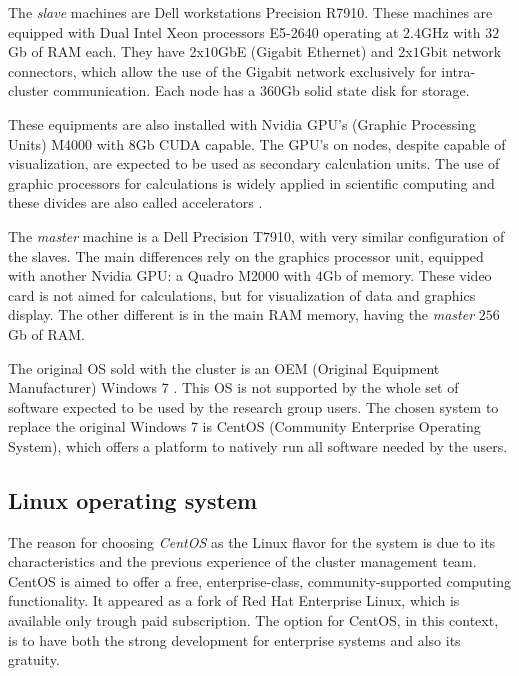 \documentclass[twoside,a4paper,12pt,english]{inac17}
\begin{document}
The \textit{slave} machines are Dell workstations Precision R7910. These machines are equipped
with Dual Intel{\textregistered} Xeon{\textregistered} processors E5-2640 operating at $2.4$GHz with
$32$Gb of RAM each. They have 2x$10$GbE (Gigabit Ethernet) and 2x$1$Gbit network connectors, which
allow the use of the Gigabit network exclusively for intra-cluster communication. Each node
has a $360$Gb solid state disk for storage.

These equipments are also installed with Nvidia{\textregistered} GPU's (Graphic Processing Units) M4000{\textregistered} with $8$Gb CUDA\cite{CUDA} capable.
The GPU's on nodes, despite capable of visualization, are expected to be used as secondary calculation units.
The use of graphic processors for calculations is widely applied in scientific computing and these divides
are also called accelerators \cite{Accelerators}.

The \textit{master} machine is a Dell Precision T7910, with very similar configuration of the slaves. The main
differences rely on the graphics processor unit, equipped with another Nvidia{\textregistered} GPU: a
Quadro{\textregistered} M2000 with $4$Gb of memory. These video card is not aimed for calculations, but for
visualization of data and graphics display. The other different is in the main RAM memory, having the \textit{master}
$256$Gb of RAM. 

The original OS sold with the cluster is an OEM (Original Equipment Manufacturer) Windows 7{\textregistered} \cite{windows7}. This
OS is not supported by the whole set of software expected to be used by the research group users. The chosen
system to replace the original Windows 7 is CentOS (Community Enterprise Operating System)\cite{centos}, which offers a platform to natively run all
software needed by the users.

\subsection{Linux operating system}

The reason for choosing \textit{CentOS} as the Linux flavor for the system is due to its characteristics and the previous
experience of the cluster management team. CentOS is aimed to offer a free, enterprise-class, community-supported computing
functionality. It appeared as a fork of Red Hat Enterprise Linux, which is available only trough paid subscription. The option
for CentOS, in this context, is to have both the strong development for enterprise systems and also its gratuity.
\end{document}
